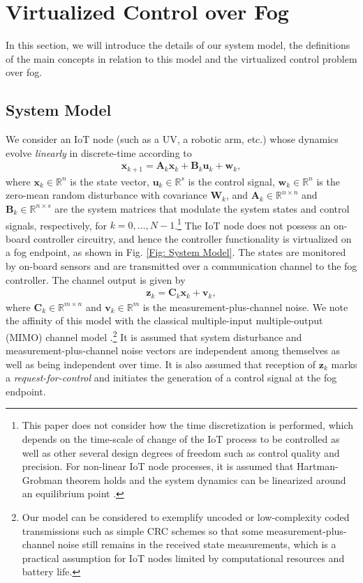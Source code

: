 \documentclass[10pt, journal, letterpaper]{IEEEtran}
\newcommand{\field}[1]{\ensuremath{\mathbb{#1}}}
\newcommand{\R}{\ensuremath{\field{R}}} %
\newcommand{\1}{\ensuremath{\mathbf{1}}} %
\renewcommand{\vec}[1]{\ensuremath{\boldsymbol{#1}}} %
\begin{document}
\section{Virtualized Control over Fog} \label{Section: System Model}
In this section, we will introduce the details of our system model, the definitions of the main concepts in relation to this model and the virtualized control problem over fog. %

\subsection{System Model}

We consider an IoT node (such as a UV, a robotic arm, etc.) whose dynamics evolve {\em linearly} in discrete-time according to
\begin{eqnarray}
\vec{x}_{k+1} = \vec{A}_k  \vec{x}_{k} + \vec{B}_k  \vec{u}_{k} + \vec{w}_k,  \label{Eqn: System Dynamics}
\end{eqnarray}
where $\vec{x}_{k} \in \R^n$ is the state vector, $\vec{u}_{k} \in \R^s$ is the control signal, $\vec{w}_k \in \R^n$ is the zero-mean random disturbance with covariance $\vec{W}_k$, and $\vec{A}_k \in \R^{n \times n}$ and $\vec{B}_k \in \R^{n \times s}$ are the system matrices that modulate the system states and control signals, respectively, for $k=0, \ldots, N-1$.\footnote{This paper does not consider how the time discretization is performed, which depends on the time-scale of change of the IoT process to be controlled as well as other several design degrees of freedom such as control quality and precision. For non-linear IoT node processes, it is assumed that Hartman-Grobman theorem holds and the system dynamics can be linearized around an equilibrium point \cite{Strogatz95}.}  The IoT node does not possess an on-board controller circuitry, and hence the controller functionality is virtualized on a fog endpoint, as shown in Fig. \ref{Fig: System Model}. The states are monitored by on-board sensors and are transmitted over a communication channel to the fog controller. The channel output is given by
\begin{eqnarray}
\vec{z}_k = \vec{C}_k \vec{x}_{k} + \vec{v}_k, \label{Eqn: Channel Equation}
\end{eqnarray}
where $\vec{C}_k \in \R^{m \times n}$ and $\vec{v}_k \in \R^m$ is the measurement-plus-channel noise.  We note the affinity of this model with the classical multiple-input multiple-output (MIMO) channel model \cite{Tse05}.\footnote{Our model can be considered to exemplify uncoded or low-complexity coded transmissions such as simple CRC schemes so that some measurement-plus-channel noise still remains in the received state measurements, which is a practical assumption for IoT nodes limited by computational resources and battery life.}  It is assumed that system disturbance and measurement-plus-channel noise vectors are independent among themselves as well as being independent over time. It is also assumed that reception of $\vec{z}_k$ marks a {\em request-for-control} and initiates the generation of a control signal at the fog endpoint.
\end{document}
